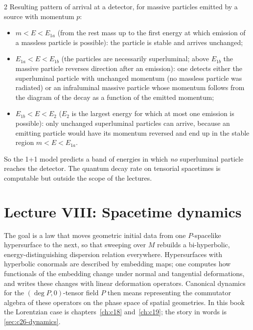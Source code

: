 \begin{paracol}{2}
Resulting pattern of arrival at a detector, for massive particles emitted by a source with momentum $p$:
\begin{itemize}
  \item $m<E<E_{1a}$ (from the rest mass up to the first energy at which emission of a massless particle is possible): the particle is stable and arrives unchanged;
  \item $E_{1a}<E<E_{1b}$ (the particles are necessarily superluminal; above $E_{1b}$ the massive particle reverses direction after an emission): one detects either the superluminal particle with unchanged momentum (no massless particle was radiated) or an infraluminal massive particle whose momentum follows from the diagram of the decay as a function of the emitted momentum;
  \item $E_{1b}<E<E_2$ ($E_2$ is the largest energy for which at most one emission is possible): only unchanged superluminal particles can arrive, because an emitting particle would have its momentum reversed and end up in the stable region $m<E<E_{1a}$.
\end{itemize}
So the 1+1 model predicts a band of energies in which \emph{no} superluminal particle reaches the detector. The quantum decay rate on tensorial spacetimes is computable but outside the scope of the lectures.

\section{Lecture VIII: Spacetime dynamics}\label{sec:c29-L8}

 The goal is a law that moves geometric initial data from one $P$-spacelike hypersurface to the next, so that sweeping over $M$ rebuilds a bi-hyperbolic, energy-distinguishing dispersion relation everywhere. Hypersurfaces with hyperbolic conormals are described by embedding maps; one computes how functionals of the embedding change under normal and tangential deformations, and writes these changes with linear deformation operators. Canonical dynamics for the $(\deg P,0)$-tensor field $P$ then means representing the commutator algebra of these operators on the phase space of spatial geometries. In this book the Lorentzian case is chapters~\ref{ch:c18} and~\ref{ch:c19}; the story in words is \cref{sec:c26-dynamics}.


\end{paracol}

